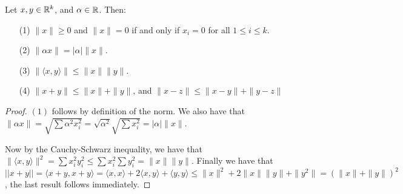   \begin{theorem}\label{theorem_1.5.2}
    Let $x,y \in \mathbb{R}^k$, and  $\alpha \in \mathbb{R}$. Then:
    \begin{enumerate}
      \item[(1)] $\|x\| \geq 0$ and $\|x\|=0$ if and only if $x_i=0$ for
        all $1 \leq i \leq k$.

      \item[(2)] $\|\alpha x\|=|\alpha|\|x\|$.

      \item[(3)] $\|\langle x,y \rangle\| \leq \|x\|\|y\|$.

      \item[(4)] $\|x+y\| \leq \|x\|+\|y\|$, and $\|x-z\| \leq \|x-y\|+\|y-z\|$
    \end{enumerate}
  \end{theorem}
  \begin{proof}
    $(1)$ follows by definition of the norm. We also have that
    $\|\alpha x\|=\sqrt{\sum{\alpha^2x_i^2}}=\sqrt{\alpha^2}\sqrt{\sum{x_i^2}}
    =|\alpha|\|x\|$.

    Now by the Cauchy-Schwarz inequality, we have that $\|\langle x,y \rangle\|^2
    =\sum{x_i^2y_i^2} \leq \sum{x_i^2}\sum{y_i^2}=\|x\|\|y\|$. Finally we have
    that $||x+y||=\langle x+y,x+y \rangle=\langle x,x \rangle+2\langle x,y \rangle
    + \langle y,y \rangle \leq \|x\|^2+2\|x\|\|y\|+\|y^2\|=(\|x\|+\|y\|)^2$,
    the last result follows immediately.
  \end{proof}
